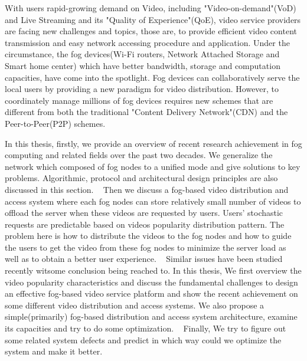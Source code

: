 \begin{enabstract}
With users rapid-growing demand on Video, including "Video-on-demand"(VoD) and Live Streaming and
its "Quality of Experience"(QoE), video service providers are facing new challenges and topics, those are,
to provide efficient video content transmission and easy network accessing procedure and application.
 Under the circumstance, the fog devices(Wi-Fi routers, Network Attached Storage and Smart home center)
 which have better bandwidth, storage and computation capacities, have come into the spotlight.
 Fog devices can collaboratively serve the local users by providing a new paradigm for video distribution.
  However, to coordinately manage millions of fog devices requires  new schemes that are different from
  both the traditional "Content Delivery Network"(CDN) and the Peer-to-Peer(P2P) schemes.

In this thesis, firstly, we provide an overview of recent research achievement in fog computing and related fields over the past two decades. We generalize the network which composed of fog nodes to a unified mode and give solutions to key problems. Algorithmic, protocol and architectural design principles are also discussed in this section.
 
Then we discuss a fog-based video distribution and access system where each fog nodes can store relatively small number of videos to offload the server when these videos are requested by users. Users’ stochastic requests are predictable based on videos popularity distribution pattern. The problem here is how to distribute the videos to the fog nodes and how to guide the users to get the video from these fog nodes to minimize the server load as well as to obtain a better user experience.
 
Similar issues have been studied recently witsome conclusion being reached to. In this thesis, We first overview the video popularity characteristics and discuss the fundamental challenges to design an effective fog-based video service platform and show the recent achievement on
some different video distribution and access systems. We also propose a simple(primarily) fog-based distribution and access system architecture, examine its capacities and try to do some optimization.
 
Finally, We try to figure out some related system defects and predict in which way could we optimize the system and make it better.

\end{enabstract}
